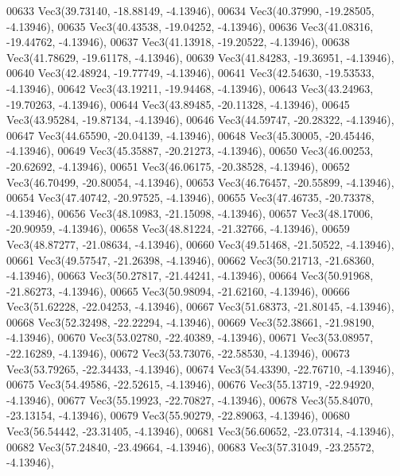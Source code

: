 \begin{DoxyCode}
00633         Vec3(39.73140, -18.88149, -4.13946),
00634         Vec3(40.37990, -19.28505, -4.13946),
00635         Vec3(40.43538, -19.04252, -4.13946),
00636         Vec3(41.08316, -19.44762, -4.13946),
00637         Vec3(41.13918, -19.20522, -4.13946),
00638         Vec3(41.78629, -19.61178, -4.13946),
00639         Vec3(41.84283, -19.36951, -4.13946),
00640         Vec3(42.48924, -19.77749, -4.13946),
00641         Vec3(42.54630, -19.53533, -4.13946),
00642         Vec3(43.19211, -19.94468, -4.13946),
00643         Vec3(43.24963, -19.70263, -4.13946),
00644         Vec3(43.89485, -20.11328, -4.13946),
00645         Vec3(43.95284, -19.87134, -4.13946),
00646         Vec3(44.59747, -20.28322, -4.13946),
00647         Vec3(44.65590, -20.04139, -4.13946),
00648         Vec3(45.30005, -20.45446, -4.13946),
00649         Vec3(45.35887, -20.21273, -4.13946),
00650         Vec3(46.00253, -20.62692, -4.13946),
00651         Vec3(46.06175, -20.38528, -4.13946),
00652         Vec3(46.70499, -20.80054, -4.13946),
00653         Vec3(46.76457, -20.55899, -4.13946),
00654         Vec3(47.40742, -20.97525, -4.13946),
00655         Vec3(47.46735, -20.73378, -4.13946),
00656         Vec3(48.10983, -21.15098, -4.13946),
00657         Vec3(48.17006, -20.90959, -4.13946),
00658         Vec3(48.81224, -21.32766, -4.13946),
00659         Vec3(48.87277, -21.08634, -4.13946),
00660         Vec3(49.51468, -21.50522, -4.13946),
00661         Vec3(49.57547, -21.26398, -4.13946),
00662         Vec3(50.21713, -21.68360, -4.13946),
00663         Vec3(50.27817, -21.44241, -4.13946),
00664         Vec3(50.91968, -21.86273, -4.13946),
00665         Vec3(50.98094, -21.62160, -4.13946),
00666         Vec3(51.62228, -22.04253, -4.13946),
00667         Vec3(51.68373, -21.80145, -4.13946),
00668         Vec3(52.32498, -22.22294, -4.13946),
00669         Vec3(52.38661, -21.98190, -4.13946),
00670         Vec3(53.02780, -22.40389, -4.13946),
00671         Vec3(53.08957, -22.16289, -4.13946),
00672         Vec3(53.73076, -22.58530, -4.13946),
00673         Vec3(53.79265, -22.34433, -4.13946),
00674         Vec3(54.43390, -22.76710, -4.13946),
00675         Vec3(54.49586, -22.52615, -4.13946),
00676         Vec3(55.13719, -22.94920, -4.13946),
00677         Vec3(55.19923, -22.70827, -4.13946),
00678         Vec3(55.84070, -23.13154, -4.13946),
00679         Vec3(55.90279, -22.89063, -4.13946),
00680         Vec3(56.54442, -23.31405, -4.13946),
00681         Vec3(56.60652, -23.07314, -4.13946),
00682         Vec3(57.24840, -23.49664, -4.13946),
00683         Vec3(57.31049, -23.25572, -4.13946),

\end{DoxyCode}
